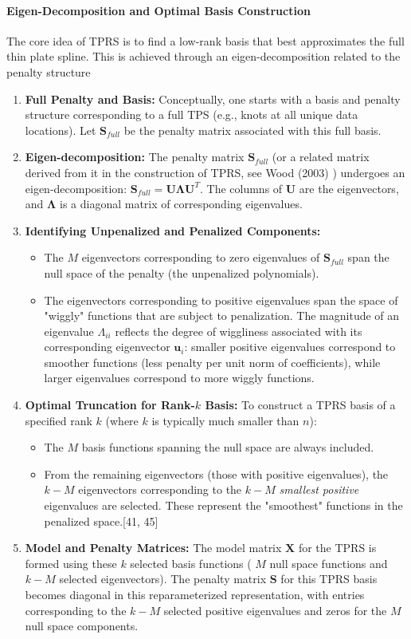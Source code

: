 \documentclass[11pt, a4paper]{article}
\begin{document}
\paragraph{Eigen-Decomposition and Optimal Basis Construction}
The core idea of TPRS is to find a low-rank basis that best approximates the full thin plate spline. This is achieved through an eigen-decomposition related to the penalty structure 
\begin{enumerate}
 \item \textbf{Full Penalty and Basis:} Conceptually, one starts with a basis and penalty structure corresponding to a full TPS (e.g., knots at all unique data locations). Let $\mathbf{S}_{full}$ be the penalty matrix associated with this full basis.
 \item \textbf{Eigen-decomposition:} The penalty matrix $\mathbf{S}_{full}$ (or a related matrix derived from it in the construction of TPRS, see Wood (2003) ) undergoes an eigen-decomposition: $\mathbf{S}_{full} = \mathbf{U \Lambda U}^T$. The columns of $\mathbf{U}$ are the eigenvectors, and $\mathbf{\Lambda}$ is a diagonal matrix of corresponding eigenvalues.
 \item \textbf{Identifying Unpenalized and Penalized Components:}
 \begin{itemize}
\item The $M$ eigenvectors corresponding to zero eigenvalues of $\mathbf{S}_{full}$ span the null space of the penalty (the unpenalized polynomials).
\item The eigenvectors corresponding to positive eigenvalues span the space of "wiggly" functions that are subject to penalization. The magnitude of an eigenvalue $\Lambda_{ii}$ reflects the degree of wiggliness associated with its corresponding eigenvector $\mathbf{u}_i$: smaller positive eigenvalues correspond to smoother functions (less penalty per unit norm of coefficients), while larger eigenvalues correspond to more wiggly functions.
 \end{itemize}
 \item \textbf{Optimal Truncation for Rank-$k$ Basis:} To construct a TPRS basis of a specified rank $k$ (where $k$ is typically much smaller than $n$):
\begin{itemize}
\item The $M$ basis functions spanning the null space are always included.
\item From the remaining eigenvectors (those with positive eigenvalues), the $k-M$ eigenvectors corresponding to the $k-M$ \textit{smallest positive} eigenvalues are selected. These represent the "smoothest" functions in the penalized space.[41, 45]
 \end{itemize}
 \item \textbf{Model and Penalty Matrices:} The model matrix $\mathbf{X}$ for the TPRS is formed using these $k$ selected basis functions ( $M$ null space functions and $k-M$ selected eigenvectors). The penalty matrix $\mathbf{S}$ for this TPRS basis becomes diagonal in this reparameterized representation, with entries corresponding to the $k-M$ selected positive eigenvalues and zeros for the $M$ null space components.
\end{enumerate}
\end{document}
